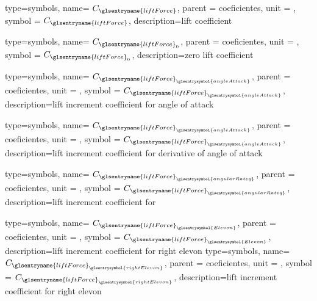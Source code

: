 {type=symbols,
    name= \ensuremath{C_{\glsentryname{liftForce}}},
    parent = {coeficientes},
    unit = \unexpanded{},
    symbol = \ensuremath{C_{\glsentryname{liftForce}}},
    description={lift coefficient}
}

{type=symbols,
    name= \ensuremath{C_{\glsentryname{liftForce}_{0}}},
    parent = {coeficientes},
    unit = \unexpanded{},
    symbol = \ensuremath{C_{\glsentryname{liftForce}_{0}}},
    description={zero lift coefficient}
}

{type=symbols,
    name= \ensuremath{C_{{\glsentryname{liftForce}}_{\glsentrysymbol{angleAttack}}}},
    parent = {coeficientes},
    unit = \unexpanded{},
    symbol = \ensuremath{C_{{\glsentryname{liftForce}}_{\glsentrysymbol{angleAttack}}}},
    description={lift increment coefficient for angle of attack}
}

{type=symbols,
    name= \ensuremath{C_{{\glsentryname{liftForce}}_{\dot{\glsentrysymbol{angleAttack}}}}},
    parent = {coeficientes},
    unit = \unexpanded{},
    symbol = \ensuremath{C_{{\glsentryname{liftForce}}_{\dot{\glsentrysymbol{angleAttack}}}}},
    description={lift increment coefficient for derivative of angle of attack}
}

{type=symbols,
    name= \ensuremath{C_{{\glsentryname{liftForce}}_{\glsentrysymbol{angularRateq}}}},
    parent = {coeficientes},
    unit = \unexpanded{},
    symbol = \ensuremath{C_{{\glsentryname{liftForce}}_{\glsentrysymbol{angularRateq}}}},
    description={lift increment coefficient for }
}

{type=symbols,
    name= \ensuremath{C_{{\glsentryname{liftForce}}_{\glsentrysymbol{Elevon}}}},
    parent = {coeficientes},
    unit = \unexpanded{},
    symbol = \ensuremath{C_{{\glsentryname{liftForce}}_{\glsentrysymbol{Elevon}}}},
    description={lift increment coefficient for right elevon}
}
{type=symbols,
    name= \ensuremath{C_{{\glsentryname{liftForce}}_{\glsentrysymbol{rightElevon}}}},
    parent = {coeficientes},
    unit = \unexpanded{},
    symbol = \ensuremath{C_{{\glsentryname{liftForce}}_{\glsentrysymbol{rightElevon}}}},
    description={lift increment coefficient for right elevon}
}


